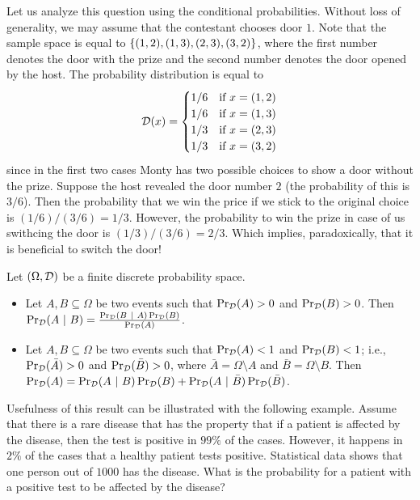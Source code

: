 Let us analyze this question using the conditional probabilities. Without loss
of generality, we may assume that the contestant chooses door $1$.
Note that the sample space is equal to $\set{(1, 2), (1, 3), (2, 3), (3, 2)}$,
where the first number denotes the door with the prize and the second number
denotes the door opened by the host. The probability distribution is equal to 
\[
  \mathcal{D}(x) = 
  \begin{cases}
    1 / 6 & \text{if } x = (1, 2) \\
    1 / 6 & \text{if } x = (1, 3) \\
    1 / 3 & \text{if } x = (2, 3) \\
    1 / 3 & \text{if } x = (3, 2)
  \end{cases}
\]
since in the first two cases Monty has two possible choices to show a door
without the prize.
Suppose the host revealed the door number $2$ (the probability of this is
$3 / 6$). Then the probability that we win the price if we stick to the original
choice is $(1 / 6) / (3 / 6) = 1 / 3$. However, the probability to win the prize
in case of us swithcing the door is $(1 / 3) / (3 / 6) = 2 / 3$. Which implies,
paradoxically, that it is beneficial to switch the door!

\begin{theorem}
  Let $(\Omega, \mathcal{D})$ be a finite discrete probability space. 
  \begin{itemize}
    \item Let $A, B \subseteq \Omega$ be two events such that
      $\Pr_{\mathcal{D}}(A) > 0$ and
      $\Pr_{\mathcal{D}}(B) > 0$. Then $\Pr_{\mathcal{D}}(A ~\rvert~ B) = 
      \frac{\Pr_{\mathcal{D}}(B ~\rvert~ A)
        \Pr_{\mathcal{D}}(B)}{\Pr_{\mathcal{D}}(A)}$.
    \item Let $A, B \subseteq \Omega$ be two events such that
      $\Pr_{\mathcal{D}}(A) < 1$ and
      $\Pr_{\mathcal{D}}(B) < 1$; i.e., 
      $\Pr_{\mathcal{D}}(\bar{A}) > 0$ and 
      $\Pr_{\mathcal{D}}(\bar{B}) > 0$, where
      $\bar{A} = \Omega \setminus A$ and $\bar{B} = \Omega \setminus B$.
      Then $\Pr_{\mathcal{D}}(A) = 
        \Pr_{\mathcal{D}}(A ~\rvert~ B)\Pr_{\mathcal{D}}(B) + 
        \Pr_{\mathcal{D}}(A ~\rvert~ \bar{B})\Pr_{\mathcal{D}}(\bar{B})$.
  \end{itemize}
\end{theorem}


Usefulness of this result can be illustrated with the following example. Assume
that there is a rare disease that has the property that if a patient is affected
by the disease, then the test is positive in $99\%$ of the cases. However, it
happens in $2\%$ of the cases that a healthy patient tests positive. Statistical
data shows that one person out of $1000$ has the disease. What is the
probability for a patient with a positive test to be affected by the disease?

